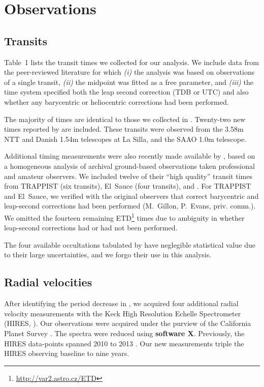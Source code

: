\documentclass[12pt,twocolumn,tighten]{aastex62}
\begin{document}
\section{Observations}
\label{sec:observations}

\subsection{Transits}

Table~1 lists the transit times we collected for our analysis.  We
include data from the peer-reviewed literature for which {\it (i)} the
analysis was based on observations of a single transit, {\it (ii)} the
midpoint was fitted as a free parameter, and {\it (iii)} the time
system specified both the leap second correction (TDB or UTC) and also
whether any barycentric or heliocentric corrections had been
performed.

The majority of times are identical to those we collected in
.  Twenty-two new times reported by
\citet{southworth_transit_2019} are included.  These transits were
observed from the 3.58m NTT and Danish 1.54m telescopes at La Silla,
and the SAAO 1.0m telescope.

Additional timing measurements were also recently made available by
\citet{baluev_2019}, based on a homogeneous analysis of archival
ground-based observations taken professional and amateur observers.
We included twelve of their ``high quality'' transit times from
TRAPPIST (six transits), El~Sauce (four transits), and
\citet{petrucci_no_2013}.  For TRAPPIST and El~Sauce, we verified with
the original observers that correct barycentric and leap-second
corrections had been performed (M.~Gillon, P.~Evans, priv{.} comm{.}).
We omitted the fourteen remaining \citeauthor{baluev_2019}
ETD\footnote{\url{http://var2.astro.cz/ETD}} times due to ambiguity in
whether leap-second corrections had or had not been performed.

The four available occultations tabulated by
 have neglegible statistical value due
to their large uncertainties, and we forgo their use in this analysis.

\subsection{Radial velocities}

After identifying the period decrease in
, we acquired four additional radial
velocity measurements with the Keck High Resolution Echelle
Spectrometer (HIRES, \citealt{vogt_hires_1994}).  Our observations
were acquired under the purview of the California Planet Survey
\citep{howard_cps_2010}.  The spectra were reduced using {\bf software
X}.  Previously, the HIRES data-points spanned 2010 to 2013
\citep{knutson_friends_2014}.  Our new measurements triple the HIRES
observing baseline to nine years.
\end{document}
